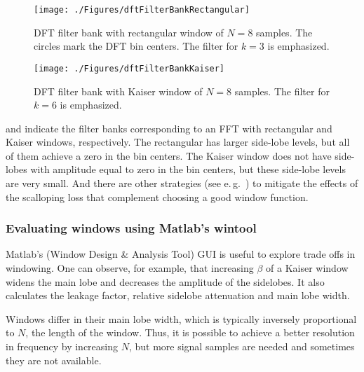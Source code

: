 \begin{figure}[htbp]
\centering
\texttt{[image: ./Figures/dftFilterBankRectangular]}
\caption{DFT filter bank with rectangular window of $N=8$ samples. The circles mark the DFT bin centers. The filter for $k=3$ is emphasized.\label{fig:dftFilterBankRectangular}}
\end{figure}

\begin{figure}[htbp]
\centering
\texttt{[image: ./Figures/dftFilterBankKaiser]}
\caption{DFT filter bank with Kaiser window of $N=8$ samples. The filter for $k=6$ is emphasized.\label{fig:dftFilterBankKaiser}}
\end{figure}

 and  indicate the filter banks corresponding to an FFT with rectangular and Kaiser windows, respectively.
The rectangular has larger side-lobe levels, but all of them achieve a zero in the bin centers. The Kaiser window does not have side-lobes with amplitude equal to zero in the bin centers, but these side-lobe levels are very small.
And there are other strategies (see e.\,g.~\cite{Lyons11}) to mitigate the effects of the scalloping loss that complement choosing a good window function.



\subsubsection{Evaluating windows using Matlab's wintool}

Matlab's  (Window Design \& Analysis Tool) GUI is useful to explore trade offs in windowing. One can observe, for example, that increasing $\beta$ of a Kaiser window widens the main lobe and decreases the amplitude of the sidelobes. It also calculates the leakage factor, relative sidelobe attenuation and main lobe width.

Windows differ in their main lobe width, which is typically inversely proportional to $N$, the length of the window. Thus, it is possible to achieve a better resolution in frequency by increasing $N$, but more signal samples are needed and sometimes they are not available.

